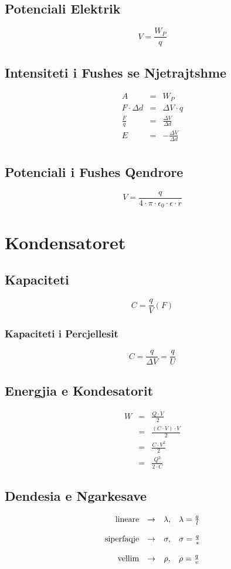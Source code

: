 \documentclass[a4paper, twocolumn]{article}
\begin{document}
\subsection{Potenciali Elektrik}
\[
V=\frac{W_{P}}{q}
\] 
\subsection{Intensiteti i Fushes se Njetrajtshme}
\begin{eqnarray*}
	A&=&W_{P}\\
	F\cdot \Delta d &=& \Delta V \cdot q\\
	\frac{F}{q}&=& \frac{\Delta V}{\Delta d}\\
	E &=& -\frac{\Delta V}{\Delta d}\\
\end{eqnarray*}
\subsection{Potenciali i Fushes Qendrore}
\[
V=\frac{q}{4\cdot \pi \cdot \epsilon _{0} \cdot \epsilon \cdot r}
\] 
\section{Kondensatoret}
\subsection{Kapaciteti}
\[
	C=\frac{q}{V} (F)
\] 
\subsubsection{Kapaciteti i Percjellesit}
\[
C=\frac{q}{\Delta V}=\frac{q}{U}
\] 
\subsection{Energjia e Kondesatorit}
\begin{eqnarray*}
	W&=&\frac{Q\cdot V}{2}\\
	 &=&\frac{(C\cdot V)\cdot V}{2}\\
	 &=&\frac{C\cdot V^2}{2}\\
	 &=&\frac{Q^2}{2\cdot C}
\end{eqnarray*}
\subsection{Dendesia e Ngarkesave}
\[
\begin{array}{r l c l}
	\text{lineare} & \to& \lambda, & \lambda = \frac{q}{l}\\
	\\
	\text{siperfaqje} & \to& \sigma, & \sigma = \frac{q}{s}\\
	\\
	\text{vellim}& \to& \rho, & \rho = \frac{q}{v}\\
\end{array}
\] 
\end{document}
